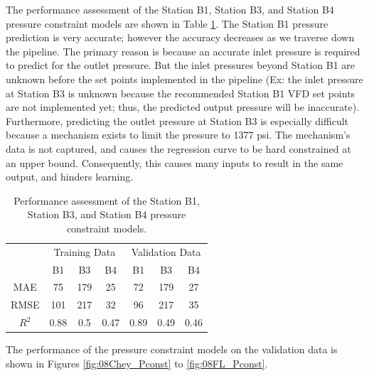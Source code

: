 The performance assessment of the Station B1, Station B3, and Station B4 pressure constraint models are shown in Table \ref{tab:08pres_const_performance}. The Station B1 pressure prediction is very accurate; however the accuracy decreases as we traverse down the pipeline.  The primary reason is because an accurate inlet pressure is required to predict for the outlet pressure.  But the inlet pressures beyond Station B1 are unknown before the set points implemented in the pipeline (Ex: the inlet pressure at Station B3 is unknown because the recommended Station B1 VFD set points are not implemented yet; thus, the predicted output pressure will be inaccurate). Furthermore, predicting the outlet pressure at Station B3 is especially difficult because a mechanism exists to limit the pressure to 1377 psi.  The mechanism's data is not captured, and causes the regression curve to be hard constrained at an upper bound. Consequently, this causes many inputs to result in the same output, and hinders learning.

\begin{table}[h]
    \centering
    {
    \begin{tabular}{c|c|c|c|c|c|c|}
    \multicolumn{1}{l|}{} & \multicolumn{3}{c|}{Training Data} & \multicolumn{3}{c|}{Validation Data} \\ \cline{2-7} 
    \multicolumn{1}{l|}{} & B1   & B3   & B4  & B1    & B3   & B4   \\ \hline
    MAE                   & 75         & 179    & 25           & 72          & 179    & 27            \\
    RMSE                  & 101        & 217    & 32           & 96          & 217    & 35            \\
    $R^2$                 & 0.88       & 0.5    & 0.47         & 0.89        & 0.49   & 0.46         
    \end{tabular}}
    \caption{Performance assessment of the Station B1, Station B3, and Station B4 pressure constraint models.}
    \label{tab:08pres_const_performance}
\end{table}

The performance of the pressure constraint models on the validation data is shown in Figures \ref{fig:08Chey_Pconst} to \ref{fig:08FL_Pconst}.

